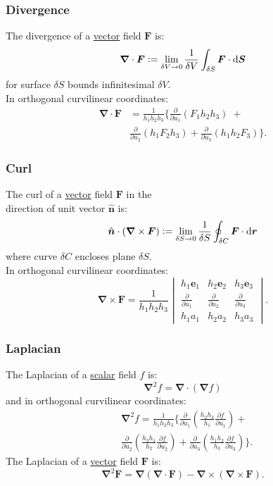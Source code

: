 \documentclass{article}
\newcommand{\deq}{\vcentcolon=}
\newcommand{\vc}[1]{\boldsymbol{#1}}
\begin{document}
\begin{multicols*}{3}
\subsubsection*{Divergence}
The divergence of a \underline{vector} field $\vc{F}$ is:
$$\vc{\nabla}\cdot\vc{F}\deq\lim_{\delta V\rightarrow0}
\frac{1}{\delta V}\int_{\delta S}
\vc{F}\cdot\dd\vc{S}$$
for surface $\delta S$ bounds infinitesimal $\delta V$. \\
In orthogonal curvilinear coordinates:
\begin{align*}
    \vc{\nabla}\cdot\vc{F}
    &=\frac{1}{h_1 h_2 h_3}\biggl\{
    \frac{\partial}{\partial u_1}(F_1 h_2 h_3)\;+ \\
    &\frac{\partial}{\partial u_2}(h_1 F_2 h_3)
    +\frac{\partial}{\partial u_3}(h_1 h_2 F_3)
    \biggr\}.
\end{align*}

\subsubsection*{Curl}
The curl of a \underline{vector} field $\vc{F}$
in the \\ direction of unit vector $\hat{\vc{n}}$ is:
$$\hat{\vc{n}}\cdot(\vc{\nabla}\times\vc{F})
\deq\lim_{\delta S\rightarrow0}\frac{1}{\delta S}
\oint_{\delta C}\vc{F}\cdot\dd\vc{r}$$
where curve $\delta C$ encloses plane $\delta S$. \\
In orthogonal curvilinear coordinates:
$$\vc{\nabla}\times\vc{F}
=\frac{1}{h_1 h_2 h_3}
\begin{vmatrix}
    h_1\vc{e}_1 & h_2\vc{e}_2 & h_3\vc{e}_3 \\
    \frac{\partial}{\partial u_1} &
    \frac{\partial}{\partial u_2} &
    \frac{\partial}{\partial u_3} \\
    h_1 a_1 & h_2 a_2 & h_3 a_3
\end{vmatrix}.$$

\subsubsection*{Laplacian}
The Laplacian of a \underline{scalar} field $f$ is:
$$\vc{\nabla}^2 f=\vc{\nabla}\cdot(\vc{\nabla}f)$$
and in orthogonal curvilinear coordinates:
\begin{align*}
    &\vc{\nabla}^2 f
    =\frac{1}{h_1 h_2 h_3}\biggl\{
    \frac{\partial}{\partial u_1}
    \left(\frac{h_2 h_3}{h_1}\frac{\partial f}{\partial u_1}\right)
    + \\
    &\frac{\partial}{\partial u_2}
    \left(\frac{h_3 h_1}{h_2}\frac{\partial f}{\partial u_2}\right)
    +\frac{\partial}{\partial u_3}
    \left(\frac{h_1 h_2}{h_3}\frac{\partial f}{\partial u_3}\right)
    \biggr\}.
\end{align*}
The Laplacian of a \underline{vector} field $\vc{F}$ is:
$$\vc{\nabla}^2\vc{F}=\vc{\nabla}(\vc{\nabla}\cdot\vc{F})
-\vc{\nabla}\times(\vc{\nabla}\times\vc{F}).$$


\end{multicols*}
\end{document}
